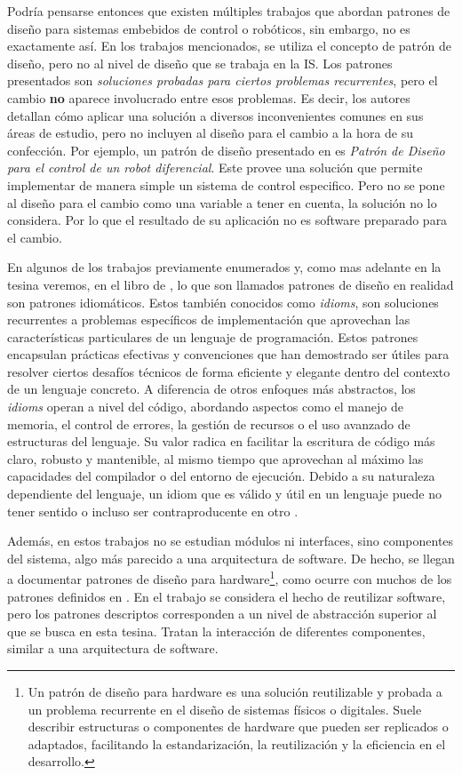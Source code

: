 Podría pensarse entonces que existen múltiples trabajos que abordan patrones de diseño para sistemas embebidos de control o robóticos, sin embargo, no es exactamente así. En los trabajos mencionados, se utiliza el concepto de patrón de diseño, pero no al nivel de diseño que se trabaja en la IS. Los patrones presentados son \textit{soluciones probadas para ciertos problemas recurrentes}, pero el cambio \textbf{no} aparece involucrado entre esos problemas. Es decir, los autores detallan cómo aplicar una solución a diversos inconvenientes comunes en sus áreas de estudio, pero no incluyen al diseño para el cambio a la hora de su confección. Por ejemplo, un patrón de diseño presentado en \cite{robotArg} es \textit{Patrón de Diseño para el control de un robot diferencial}. Este provee una solución que permite implementar de manera simple un sistema de control especifico. Pero no se pone al diseño para el cambio como una variable a tener en cuenta, la solución no lo considera. Por lo que el resultado de su aplicación no es software preparado para el cambio.

En algunos de los trabajos previamente enumerados y, como mas adelante en la tesina veremos, en el libro de \cite{douglass}, lo que son llamados patrones de diseño en realidad son patrones idiomáticos. Estos también conocidos como \textit{idioms}, son soluciones recurrentes a problemas específicos de implementación que aprovechan las características particulares de un lenguaje de programación. Estos patrones encapsulan prácticas efectivas y convenciones que han demostrado ser útiles para resolver ciertos desafíos técnicos de forma eficiente y elegante dentro del contexto de un lenguaje concreto. A diferencia de otros enfoques más abstractos, los \textit{idioms} operan a nivel del código, abordando aspectos como el manejo de memoria, el control de errores, la gestión de recursos o el uso avanzado de estructuras del lenguaje. Su valor radica en facilitar la escritura de código más claro, robusto y mantenible, al mismo tiempo que aprovechan al máximo las capacidades del compilador o del entorno de ejecución. Debido a su naturaleza dependiente del lenguaje, un idiom que es válido y útil en un lenguaje puede no tener sentido o incluso ser contraproducente en otro \cite{buschmann1996posa1}.

Además, en estos trabajos no se estudian módulos ni interfaces, sino componentes del sistema, algo más parecido a una arquitectura de software. De hecho, se llegan a documentar patrones de diseño para hardware\footnote{Un patrón de diseño para hardware es una solución reutilizable y probada a un problema recurrente en el diseño de sistemas físicos o digitales. Suele describir estructuras o componentes de hardware que pueden ser replicados o adaptados, facilitando la estandarización, la reutilización y la eficiencia en el desarrollo.}, como ocurre con muchos de los patrones definidos en \cite{critical}. En el trabajo \cite{stable} se considera el hecho de reutilizar software, pero los patrones descriptos corresponden a un nivel de abstracción superior al que se busca en esta tesina. Tratan la interacción de diferentes componentes, similar a una arquitectura de software.

